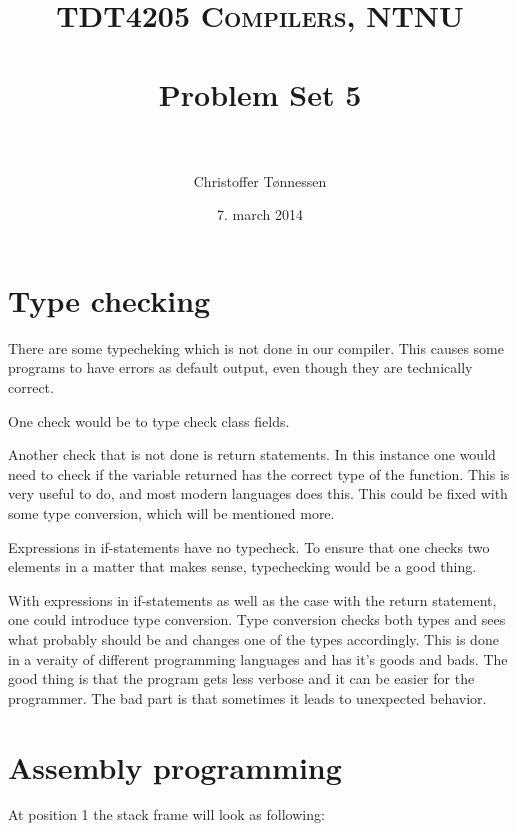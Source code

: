 \documentclass[paper=a4, fontsize=11pt]{scrartcl} %
\title{ 
\normalfont \normalsize 
\textsc{TDT4205 Compilers, NTNU} \\ [25pt] %
\horrule{0.5pt} \\[0.4cm] %
\huge Problem Set 5 \\ %
\horrule{2pt} \\[0.5cm] %
}
\author{Christoffer Tønnessen} %
\date{\normalsize7. march 2014} %
\numberwithin{equation}{section} %
\numberwithin{figure}{section} %
\numberwithin{table}{section} %
\begin{document}
\maketitle %


\section{Type checking}
There are some typecheking which is not done in our compiler.
This causes some programs to have errors as default output, even though they are technically correct.

One check would be to type check class fields.

Another check that is not done is return statements.
In this instance one would need to check if the variable returned has the correct type of the function.
This is very useful to do, and most modern languages does this.
This could be fixed with some type conversion, which will be mentioned more.

Expressions in if-statements have no typecheck.
To ensure that one checks two elements in a matter that makes sense, typechecking would be a good thing.

With expressions in if-statements as well as the case with the return statement, one could introduce type conversion.
Type conversion checks both types and sees what probably should be and changes one of the types accordingly.
This is done in a veraity of different programming languages and has it's goods and bads.
The good thing is that the program gets less verbose and it can be easier for the programmer.
The bad part is that sometimes it leads to unexpected behavior.

\newpage
\section{Assembly programming}

At position 1 the stack frame will look as following:
\end{document}
